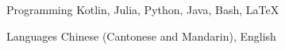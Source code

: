 

\begin{cvskills}

  \cvskill
    {Programming} %
    {Kotlin, Julia, Python, Java, Bash, LaTeX} %

  \cvskill
    {Languages} %
    {Chinese (Cantonese and Mandarin), English} %

\end{cvskills}
